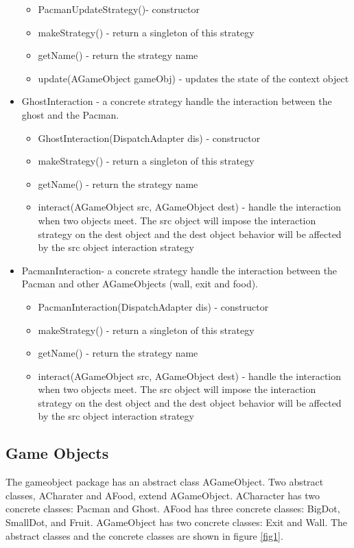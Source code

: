 \documentclass[letterpaper, 11pt]{article}
\begin{document}
\begin{itemize}
  \begin{itemize}
  \item PacmanUpdateStrategy()- constructor
  \item makeStrategy() - return a singleton of this strategy
  \item getName() - return the strategy name
  \item update(AGameObject gameObj) - updates the state of the context object
  \end{itemize}
\item GhostInteraction - a concrete strategy handle the interaction between the ghost and the Pacman.
  \begin{itemize}
  \item GhostInteraction(DispatchAdapter dis) - constructor
  \item makeStrategy() - return a singleton of this strategy
  \item getName() - return the strategy name
  \item interact(AGameObject src, AGameObject dest) - handle the interaction when two objects meet. The src object will impose the interaction strategy on the dest object and the dest object behavior will be affected by the src object interaction strategy
  \end{itemize}
  \item PacmanInteraction- a concrete strategy handle the interaction between the Pacman and other AGameObjects (wall, exit and food).
  \begin{itemize}
  \item PacmanInteraction(DispatchAdapter dis) - constructor
  \item makeStrategy() - return a singleton of this strategy
  \item getName() - return the strategy name
  \item interact(AGameObject src, AGameObject dest) - handle the interaction when two objects meet. The src object will impose the interaction strategy on the dest object and the dest object behavior will be affected by the src object interaction strategy
  \end{itemize}
  \fi
\end{itemize}

\subsection{Game Objects}
The gameobject package has an abstract class AGameObject. Two abstract classes, ACharater and AFood, extend AGameObject. ACharacter has two concrete classes: Pacman and Ghost. AFood has three concrete classes: BigDot, SmallDot, and Fruit. AGameObject has two concrete classes: Exit and Wall. The abstract classes and the concrete classes are shown in figure \ref{fig1}. 
\end{document}
